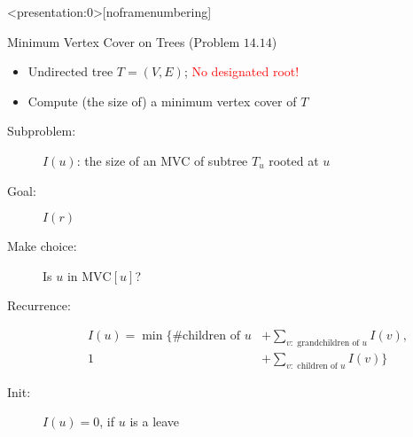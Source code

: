 
\begin{frame}<presentation:0>[noframenumbering]
  \centerline{}
\end{frame}

\begin{frame}{}
  \begin{exampleblock}{Minimum Vertex Cover on Trees (Problem $14.14$)}
    \begin{itemize}
      \item Undirected tree $T = (V, E)$; \textcolor{red}{No designated root!}
      \item Compute (the size of) a minimum vertex cover of $T$
    \end{itemize}
  \end{exampleblock}

\end{frame}
\begin{frame}{}
  \centerline{}
  \pause
  \vspace{0.30cm}

  \begin{description}
	\item[Subproblem:] $I(u)$: the size of an MVC of subtree $T_{u}$ rooted at $u$
	\item[Goal:] $I(r)$
	  \pause
	\item[Make choice:] Is $u$ in $\text{MVC}[u]$?
	\item[Recurrence:] 
	  \begin{align*}
		I(u) = \min \{\text{\# children of } u &+ \sum_{v: \text{ grandchildren of } u} I(v), \\
			1 &+ \sum_{v: \text{ children of } u} I(v)\}
	  \end{align*}
	  \pause
	\item[Init:] $I(u) = 0$, if $u$ is a leave
  \end{description}

  \pause
  \vspace{0.30cm}
  \centerline{}
\end{frame}

\begin{frame}

  \pause
  \vspace{0.50cm}
  \begin{quote}
    \centering
  \end{quote}
\end{frame}
